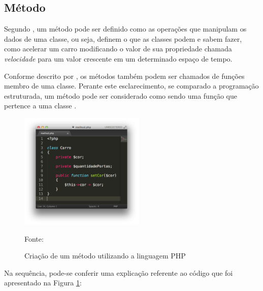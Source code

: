 \subsection{Método}

Segundo , um
método pode ser definido como as operações que manipulam os dados de uma
classe, ou seja, definem o que as classes podem e sabem fazer, como
acelerar um carro modificando o valor de sua propriedade chamada
\textit{velocidade} para um valor crescente em um determinado espaço de tempo.

Conforme descrito por , os métodos também podem ser
chamados de funções membro de uma classe. Perante este esclarecimento, se
comparado a programação estruturada, um método pode ser considerado como
sendo uma função que pertence a uma classe \cite{programmingPhp}.

\begin{figure}[h!tb]
	\caption{Criação de um método utilizando a linguagem PHP}
	\label{fig:metodo}

	\centering
	\includegraphics[width=0.53\textwidth]{images/method.png}

	\centering
	\footnotesize Fonte: \fonteOAutor
\end{figure}

\FloatBarrier 	%

Na sequência, pode-se conferir uma explicação referente ao código que foi
apresentado na Figura \ref{fig:metodo}:

